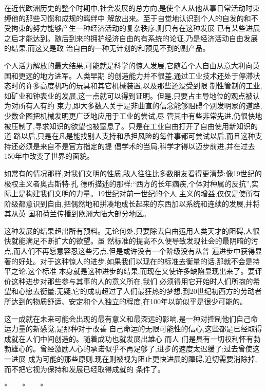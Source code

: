 ﻿\documentclass[12pt]{article}
\begin{document}
在近代欧洲历史的整个时期中,社会发展的总方向,是使个人从他从事日常活动时束缚他的那些习惯和成规的羁绊中
解放出来。至于自觉地认识到个人的自发的和不受拘束的努力能够产生一种经济活动的复杂秩序,则只有在这种发展
已有某些进展之后才能达到。随后到来的拥护经济自由的有系统的论证,乃是经济活动自由发展的结果,而这又是政
治自由的一种无计划的和预见不到的副产品。

个人活力解放的最大结果,可能就是科学的惊人发展,它随着个人自由从意大利向英国和更远的地方进军。人类早期
的创造能力并不很差,通过工业技术还处于停滞状态时的许多高度机巧的玩具和其它机械装置,以及那些还没受到限
制性管制的工业,如矿业和钟表业的发展,这一点就可以得到证明。但是,只要占主导地位的观点被认为对所有人有约
束力,即大多数人关于是非曲直的信念能够阻碍个别发明家的道路,少数企图把机械发明更广泛地应用于工业的尝试,尽
管其中有些非常先进,仍很快地被压制了,寻求知识的欲望也被窒息了。只是在工业自由打开了自由使用新知识的道
路以后,只是在凡是能找别人支持和承担风险的每件事都可尝试以后,而且这种支持还必须是来自不是官方指定的提
倡学术的当局,科学才得以迈步前进,并在过去150年中改变了世界的面貌。

如常有的情况那样,对我们文明的性质,敌人往往比多数朋友看得更清楚:像19世纪的极权主义者奥古斯特$\cdot$孔
德所描述的那样:``西方的长年痼疾,个体对种属的反抗'',实际上是构建我们文明的力量。19世纪对前一世纪的个人
主义的增益,仅仅是使所有阶级都意识到自由,把偶然地和拼凑地成长起来的东西加以系统和连续的发展,并将其从英
国和荷兰传播到欧洲大陆大部分地区。

这种发展的结果超出所有预料。无论何处,只要除去自由运用人类天才的阻碍,人很快就能满足不断扩大的欲望。虽
然标准的提高不久便导致发现社会的最阴暗的污点,而人们不再愿意容忍这些污点,但是或许没有一个阶级没有从普
遍进步中获得显著的好处。对于这种惊人的进步,如果我们以现在的标准去衡量的话,那就不会是持平之论,这个标准
本身就是这种进步的结果,而现在又使许多缺陷显现出来了。要评价这种进步对那些参与其事的人的意义所在,我们
必须得用它开始时人们所抱的希望和心愿去衡量;无疑,它的成功超过了人们最狂热的梦想,到20世纪初西方的劳动者
所达到的物质舒适、安定和个人独立的程度,在100年以前似乎是很少可能的。

这一成就在未来可能会出现的最有意义和最深远的影响,是一种对控制他们自己命运力量的新感觉,是那种对于改善
自己命运的无限可能性的信心,这些都是已经取得成就在人们中间创造的。随着成功也就发展出雄心 \myrule 而人
们是具有一切权利怀有勃勃雄心的。曾经激励人心的承诺似乎不再足够了,进步的速度太迟缓了;过去曾使这一进展
成为可能的那些原则,现在则被视为阻止更快进展的障碍,迫切需要消除掉,而不把它视为保持和发展已经取得成就的
条件了。

*　　*　　*
\end{document}
